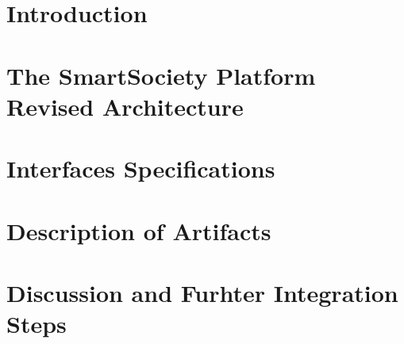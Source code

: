 \documentclass{SmartReport}
\begin{document}
\section{Introduction}
\label{sec:intro}


\newpage


\section{The SmartSociety Platform Revised Architecture}
\label{sec:arch}

\newpage

\section{Interfaces Specifications}
\label{sec:apis}

\newpage


\section{Description of Artifacts}
\label{sec:sw}

\newpage

\section{Discussion and Furhter Integration Steps}
\label{sec:conclusions}

\newpage



%
\end{document}
